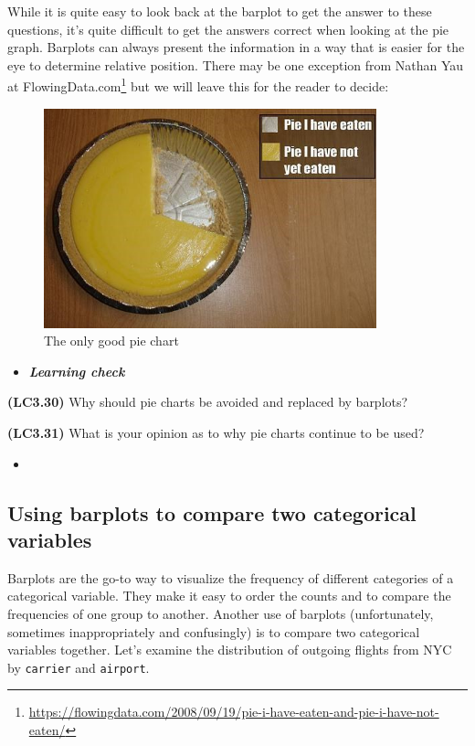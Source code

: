 \documentclass[12pt,]{krantz}
\renewcommand{\href}[2]{#2\footnote{\url{#1}}}
\newenvironment{rmdblock}[1]
  {\begin{shaded*}
  \begin{itemize}
  \renewcommand{\labelitemi}{
    \raisebox{-.7\height}[0pt][0pt]{
    }
  }
  \item
  }
  {
  \end{itemize}
  \end{shaded*}
  }
\newenvironment{learncheck}
  {\begin{rmdblock}{warning}}
  {\end{rmdblock}}
\begin{document}
While it is quite easy to look back at the barplot to get the answer to
these questions, it's quite difficult to get the answers correct when
looking at the pie graph. Barplots can always present the information in
a way that is easier for the eye to determine relative position. There
may be one exception from Nathan Yau at
\href{https://flowingdata.com/2008/09/19/pie-i-have-eaten-and-pie-i-have-not-eaten/}{FlowingData.com}
but we will leave this for the reader to decide:

\begin{figure}

{\centering \includegraphics[width=\textwidth,height=2.5in]{images/Pie-I-have-Eaten} 

}

\caption{The only good pie chart}\label{fig:unnamed-chunk-49}
\end{figure}

\begin{learncheck}
\textbf{\emph{Learning check}}
\end{learncheck}

\textbf{(LC3.30)} Why should pie charts be avoided and replaced by
barplots?

\textbf{(LC3.31)} What is your opinion as to why pie charts continue to
be used?

\begin{learncheck}

\end{learncheck}

\subsection{Using barplots to compare two categorical
variables}\label{using-barplots-to-compare-two-categorical-variables}

Barplots are the go-to way to visualize the frequency of different
categories of a categorical variable. They make it easy to order the
counts and to compare the frequencies of one group to another. Another
use of barplots (unfortunately, sometimes inappropriately and
confusingly) is to compare two categorical variables together. Let's
examine the distribution of outgoing flights from NYC by
\texttt{carrier} and \texttt{airport}.
\end{document}
